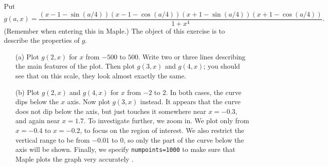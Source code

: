 \documentclass[a4paper,10pt]{amsbook}
\numberwithin{example}{chapter}
\begin{document}
\begin{exercise}\label{ex-quartic}
 Put 
 \[ g(a,x) =
    \frac { (x-1-\sin(a/4))(x-1-\cos(a/4))
            (x+1-\sin(a/4))(x+1-\cos(a/4))}
          {1+{x}^{4}}. 
 \]
 (Remember \note{\NOTEarrow,\NOTEmultifunc} when entering
 this in Maple.)  The object of this exercise is to describe
 the properties of $g$.  
 \begin{itemize}
  \item[(a)] Plot $g(2,x)$ for $x$ from $-500$ to $500$.
   Write two or three lines describing the main features of
   the plot.  Then plot $g(3,x)$ and $g(4,x)$; you should see
   that on this scale, they look almost exactly the same.
  \item[(b)] Plot $g(2,x)$ and $g(4,x)$ for $x$ from $-2$ to $2$.  In
   both cases, the curve dips below the $x$ axis.  Now plot $g(3,x)$
   instead.  It appears that the curve does not dip below the axis,
   but just touches it somewhere near $x=-0.3$, and again near
   $x=1.7$.  To investigate further, we zoom in.  We plot only from
   $x=-0.4$ to $x=-0.2$, to focus on the region of interest.  We also
   restrict the vertical range \note{\NOTEvertrange} to be
   from $-0.01$ to $0$, so only the part of the curve below
   the axis will be shown.  Finally, we specify
   \verb~numpoints=1000~ to make sure that Maple plots the
   graph very accurately \note{\NOTEnumpoints}.  


\end{itemize}
\end{exercise}
\end{document}
